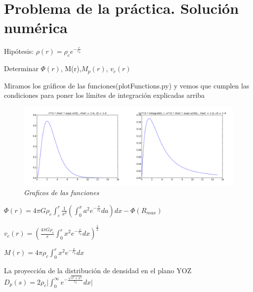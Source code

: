 \documentclass[12pt]{book}
\begin{document}
\section*{Problema de la práctica. Solución numérica}
\begin{description}
\item Hipótesis: $\rho(r) = \rho_c e^{-\frac{r}{r_0}} $
\item Determinar $\Phi(r)$, M(r),$M_p(r)$, $v_c(r)$ 

\end{description}


\begin{description}
\item Miramos los gráficos de las funciones(plotFunctions.py) y vemos que cumplen las condiciones para poner los límites de integración explicadas arriba
\begin{figure}[!ht]
 \centering
 \includegraphics[scale=0.33]{func12Plot.png}
 \caption{\emph{Graficos de las funciones}}
\end{figure}

\item $\Phi(r) = 4 \pi G \rho_c \int_\varepsilon^r{ \frac{1}{x^2}(\int_0^x{a^2 e^{-\frac{a}{r_0}}da})dx} -\Phi(R_{max})$
\item $v_c(r) = (\frac{4 \pi G \rho_c}{r}\int_0^r{x^2 e^{-\frac{x}{r_0}}dx} )^{\frac{1}{2}}  $ 
\item $M(r) = 4 \pi \rho_c \int_0^r{x^2 e^{-\frac{x}{r_0}}dx}$ 
\item La proyección de la distribución de densidad en el plano YOZ
$D_p(s) = 2 \rho_c \lvert \int_0^\infty{e^{-\frac{\sqrt{s^2 + x^2}}{r_0}} dx}  \rvert$



\end{description}
\end{document}
